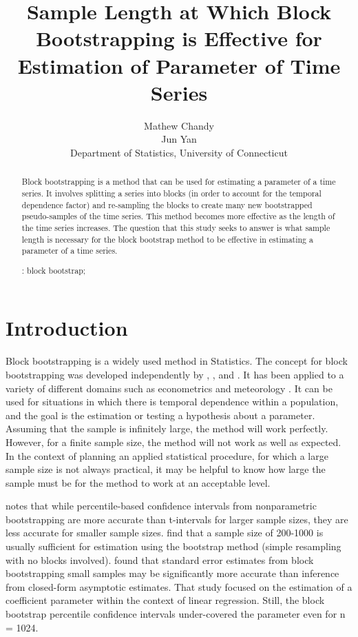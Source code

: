 \documentclass[12pt, letterpaper, titlepage]{article}
\title{Sample Length at Which Block Bootstrapping is Effective for Estimation of Parameter of Time Series}
\author{Mathew Chandy\\
  Jun Yan\\[1ex]
  Department of Statistics, University of Connecticut\\
}
\date{}
\begin{document}
 
\maketitle

\doublespace

\begin{abstract}
Block bootstrapping is a method that can be used for estimating a parameter of a time
series. It involves splitting a series into blocks (in order to account for the temporal dependence
factor) and re-sampling the blocks to create many new bootstrapped pseudo-samples of the time series.
This method becomes more effective as the length of the time series increases. 
The question that this study seeks to answer is what sample length is necessary for the block
bootstrap method to be effective in estimating a parameter of a time
series.

\bigskip
\noindent{}:
block bootstrap;
\end{abstract}

\section{Introduction}
\label{sec:intro}

Block bootstrapping is a widely used method in Statistics. The concept for block 
bootstrapping was developed independently by \citet{hall1985resampling}, \citet{carlstein1986use}, and 
\citet{kunsch1989jackknife}. \citet{radovanov2014comparison} It has been applied to a variety of 
different domains such 
as econometrics \citep{mackinnon2006bootstrap} and meteorology \citep{varga2017generalised}. It can be used for 
situations in which there is temporal dependence within a population, and the goal is the estimation or testing a hypothesis about a parameter. Assuming that the sample is infinitely 
large, the method will work perfectly. However, for a finite sample size, the method will 
not work as well as expected. In the context of planning an applied 
statistical procedure, for which a large sample size is not always practical, it may be helpful to know how large the sample must be for the method to work at an acceptable level. 

\citet{hesterberg2015teachers} notes that while percentile-based confidence intervals from nonparametric bootstrapping are more accurate than t-intervals for larger sample sizes, they are less accurate for smaller sample sizes. \citet{nevitt2001performance} find that a sample size of 200-1000 is usually sufficient for estimation using the bootstrap method (simple resampling with no blocks involved). 
\citet{goncalves2005bootstrap} found that standard error estimates from block bootstrapping small 
samples may be significantly more accurate than inference from closed-form asymptotic estimates. That study focused on the estimation of a coefficient parameter within the context of linear regression. Still, the block bootstrap percentile confidence intervals under-covered the parameter even for n = 1024. 
\end{document}
